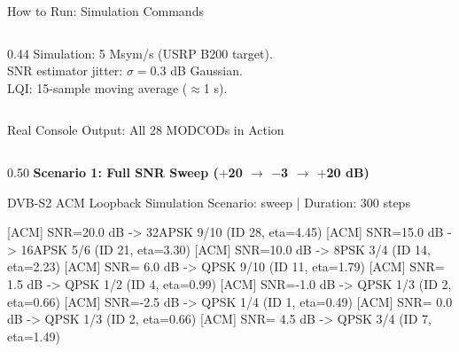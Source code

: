\documentclass[aspectratio=169,10pt]{beamer}
\begin{document}
\begin{frame}[fragile,shrink=20]{How to Run: Simulation Commands}
\begin{columns}[T]
\begin{column}{0.44\textwidth}
      \vspace{0.2em}
      \scriptsize Simulation: 5 Msym/s (USRP B200 target).\\
      SNR estimator jitter: $\sigma=0.3$ dB Gaussian.\\
      LQI: 15-sample moving average ($\approx$1 s).
    \end{column}
  \end{columns}
\end{frame}

\begin{frame}[fragile,shrink=12]{Real Console Output: All 28 MODCODs in Action}
  \begin{columns}[T]
    \begin{column}{0.50\textwidth}
      \textbf{Scenario 1: Full SNR Sweep ($+$20 $\to$ $-$3 $\to$ $+$20 dB)}
\begin{terminal}
DVB-S2 ACM Loopback Simulation
Scenario: sweep  |  Duration: 300 steps

[ACM] SNR=20.0 dB -> 32APSK 9/10  (ID 28, eta=4.45)
[ACM] SNR=15.0 dB -> 16APSK 5/6   (ID 21, eta=3.30)
[ACM] SNR=10.0 dB -> 8PSK 3/4     (ID 14, eta=2.23)
[ACM] SNR= 6.0 dB -> QPSK 9/10    (ID 11, eta=1.79)
[ACM] SNR= 1.5 dB -> QPSK 1/2     (ID  4, eta=0.99)
[ACM] SNR=-1.0 dB -> QPSK 1/3     (ID  2, eta=0.66)
[ACM] SNR=-2.5 dB -> QPSK 1/4     (ID  1, eta=0.49)
[ACM] SNR= 0.0 dB -> QPSK 1/3     (ID  2, eta=0.66)
[ACM] SNR= 4.5 dB -> QPSK 3/4     (ID  7, eta=1.49)


\end{terminal}
\end{column}
\end{columns}
\end{frame}
\end{document}
